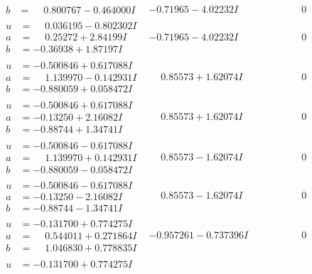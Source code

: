 \documentclass[1p]{elsarticle_modified}
\theoremstyle{definition}
\begin{document}
$$\begin{array}{c|c|c}
\begin{aligned}
b &= \phantom{-}0.800767 - 0.464000 I\end{aligned}
 & -0.71965 - 4.02232 I & \phantom{-0.000000 } 0 \\ \hline\begin{aligned}
u &= \phantom{-}0.036195 - 0.802302 I \\
a &= \phantom{-}0.25272 + 2.84199 I \\
b &= -0.36938 + 1.87197 I\end{aligned}
 & -0.71965 - 4.02232 I & \phantom{-0.000000 } 0 \\ \hline\begin{aligned}
u &= -0.500846 + 0.617088 I \\
a &= \phantom{-}1.139970 - 0.142931 I \\
b &= -0.880059 + 0.058472 I\end{aligned}
 & \phantom{-}0.85573 + 1.62074 I & \phantom{-0.000000 } 0 \\ \hline\begin{aligned}
u &= -0.500846 + 0.617088 I \\
a &= -0.13250 + 2.16082 I \\
b &= -0.88744 + 1.34741 I\end{aligned}
 & \phantom{-}0.85573 + 1.62074 I & \phantom{-0.000000 } 0 \\ \hline\begin{aligned}
u &= -0.500846 - 0.617088 I \\
a &= \phantom{-}1.139970 + 0.142931 I \\
b &= -0.880059 - 0.058472 I\end{aligned}
 & \phantom{-}0.85573 - 1.62074 I & \phantom{-0.000000 } 0 \\ \hline\begin{aligned}
u &= -0.500846 - 0.617088 I \\
a &= -0.13250 - 2.16082 I \\
b &= -0.88744 - 1.34741 I\end{aligned}
 & \phantom{-}0.85573 - 1.62074 I & \phantom{-0.000000 } 0 \\ \hline\begin{aligned}
u &= -0.131700 + 0.774275 I \\
a &= \phantom{-}0.544011 + 0.271864 I \\
b &= \phantom{-}1.046830 + 0.778835 I\end{aligned}
 & -0.957261 - 0.737396 I & \phantom{-0.000000 } 0 \\ \hline\begin{aligned}
u &= -0.131700 + 0.774275 I \\

\end{aligned}
\end{array}$$
\end{document}
